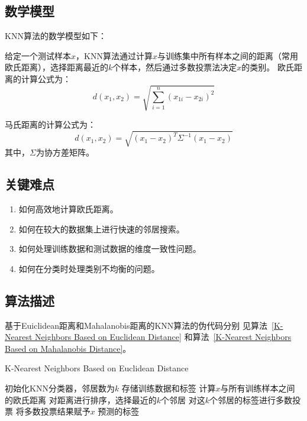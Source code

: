 \documentclass[12pt]{article}
\begin{document}
\subsection{数学模型}
KNN算法的数学模型如下：

给定一个测试样本$x$，KNN算法通过计算$x$与训练集中所有样本之间的距离（常用欧氏距离），选择距离最近的$k$个样本，然后通过多数投票法决定$x$的类别。
欧氏距离的计算公式为：
\[
  d(x_1, x_2) = \sqrt{\sum_{i=1}^{n} (x_{1i} - x_{2i})^2}
\]

马氏距离的计算公式为：
\[d(x_1, x_2) = \sqrt{(x_1 - x_2)^T \Sigma^{-1} (x_1 - x_2)}\]
其中，$\Sigma$为协方差矩阵。


\subsection{关键难点}
\begin{enumerate}
  \item 如何高效地计算欧氏距离。
  \item 如何在较大的数据集上进行快速的邻居搜索。
  \item 如何处理训练数据和测试数据的维度一致性问题。
  \item 如何在分类时处理类别不均衡的问题。
\end{enumerate}


\subsection{算法描述}
基于Euiclidean距离和Mahalanobis距离的KNN算法的伪代码分别
见算法~\ref{K-Nearest Neighbors Based on Euclidean Distance} 和算法~\ref{K-Nearest Neighbors Based on Mahalanobis Distance}。

\begin{algorithm}
  \caption{K-Nearest Neighbors Based on Euclidean Distance}
  \label{K-Nearest Neighbors Based on Euclidean Distance}
  \begin{algorithmic}[1]
    \State 初始化KNN分类器，邻居数为$k$
    \State 存储训练数据和标签
    \EndProcedure
    \State 计算$x$与所有训练样本之间的欧氏距离
    \State 对距离进行排序，选择最近的$k$个邻居
    \State 对这$k$个邻居的标签进行多数投票
    \State 将多数投票结果赋予$x$
    \EndFor
    \State \Return 预测的标签
    \EndProcedure
  \end{algorithmic}
\end{algorithm}
\end{document}
